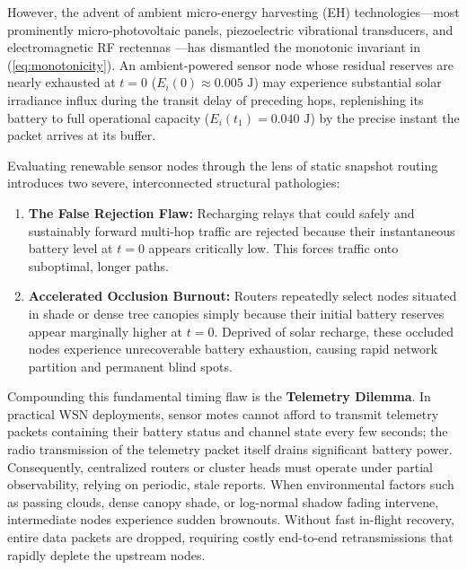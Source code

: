 \documentclass[journal]{IEEEtran}
\begin{document}
However, the advent of ambient micro-energy harvesting (EH) technologies---most prominently micro-photovoltaic panels, piezoelectric vibrational transducers, and electromagnetic RF rectennas \cite{kansal2007power, gorlatova2013computational, sethi2017internet}---has dismantled the monotonic invariant in (\ref{eq:monotonicity}). An ambient-powered sensor node whose residual reserves are nearly exhausted at $t=0$ ($E_i(0) \approx 0.005\text{ J}$) may experience substantial solar irradiance influx during the transit delay of preceding hops, replenishing its battery to full operational capacity ($E_i(t_1) = 0.040\text{ J}$) by the precise instant the packet arrives at its buffer.

Evaluating renewable sensor nodes through the lens of static snapshot routing introduces two severe, interconnected structural pathologies:
\begin{enumerate}
    \item \textbf{The False Rejection Flaw:} Recharging relays that could safely and sustainably forward multi-hop traffic are rejected because their instantaneous battery level at $t=0$ appears critically low. This forces traffic onto suboptimal, longer paths.
    \item \textbf{Accelerated Occlusion Burnout:} Routers repeatedly select nodes situated in shade or dense tree canopies simply because their initial battery reserves appear marginally higher at $t=0$. Deprived of solar recharge, these occluded nodes experience unrecoverable battery exhaustion, causing rapid network partition and permanent blind spots.
\end{enumerate}

Compounding this fundamental timing flaw is the \textbf{Telemetry Dilemma}. In practical WSN deployments, sensor motes cannot afford to transmit telemetry packets containing their battery status and channel state every few seconds; the radio transmission of the telemetry packet itself drains significant battery power. Consequently, centralized routers or cluster heads must operate under partial observability, relying on periodic, stale reports. When environmental factors such as passing clouds, dense canopy shade, or log-normal shadow fading intervene, intermediate nodes experience sudden brownouts. Without fast in-flight recovery, entire data packets are dropped, requiring costly end-to-end retransmissions that rapidly deplete the upstream nodes.
\end{document}
